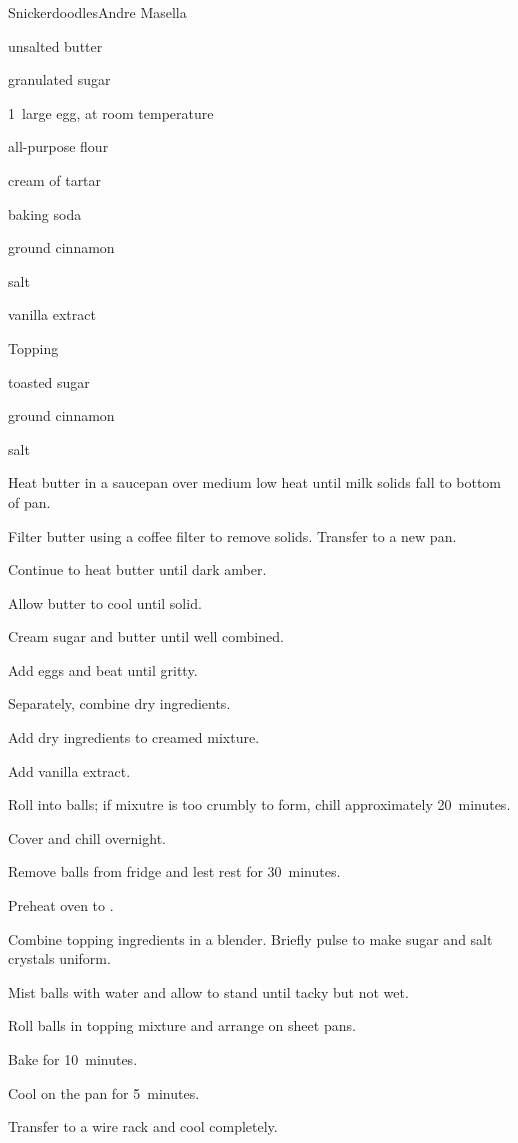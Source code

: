 \begin{recipe}{Snickerdoodles}{Andre Masella}{}


\begin{ingredients}
\item {} unsalted butter
\item {} granulated sugar
\item 1~large egg, at room temperature
\item {} all-purpose flour
\item {} cream of tartar
\item {} baking soda
\item \tp{1\half} ground cinnamon
\item \tp{\half} salt
\item {} vanilla extract
\end{ingredients}

Topping
\begin{ingredients}
\item {} toasted sugar
\item \tp{\half} ground cinnamon
\item \tp{\quarter} salt
\end{ingredients}

\begin{directions}
\item Heat butter in a saucepan over medium low heat until milk solids fall to bottom of pan.
\item Filter butter using a coffee filter to remove solids. Transfer to a new pan.
\item Continue to heat butter until dark amber.
\item Allow butter to cool until solid.
\item Cream sugar and butter until well combined.
\item Add eggs and beat until gritty.
\item Separately, combine dry ingredients.
\item Add dry ingredients to creamed mixture.
\item Add vanilla extract.
\item Roll into balls; if mixutre is too crumbly to form, chill approximately 20~minutes.
\item Cover and chill overnight.
\item Remove balls from fridge and lest rest for 30~minutes.
\item Preheat oven to .
\item Combine topping ingredients in a blender. Briefly pulse to make sugar and salt crystals uniform.
\item Mist balls with water and allow to stand until tacky but not wet.
\item Roll balls in topping mixture and arrange on sheet pans.
\item Bake for 10~minutes.
\item Cool on the pan for 5~minutes.
\item Transfer to a wire rack and cool completely.
\end{directions}
\end{recipe}
